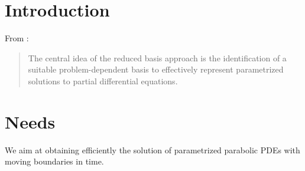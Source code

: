 \documentclass[../main.tex]{subfiles}
\begin{document}

        




\section{Introduction}

From  \cite{2016_CertifiedReducedBasisMethodsParametrizedPDE_Hesthaven}:
\begin{quotation}
    The central idea of the reduced basis approach is the identification of a suitable problem-dependent basis to effectively represent parametrized solutions to partial differential equations.
\end{quotation}

\section{Needs}
We aim at obtaining efficiently the solution of parametrized parabolic PDEs with moving boundaries in time.
\end{document}

